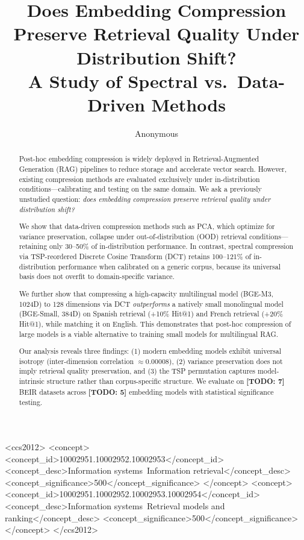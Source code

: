 \documentclass[sigconf]{acmart}
\begin{document}
\title{Does Embedding Compression Preserve Retrieval Quality Under Distribution Shift?\\ A Study of Spectral vs.\ Data-Driven Methods}

\author{Anonymous}

\begin{abstract}
Post-hoc embedding compression is widely deployed in Retrieval-Augmented Generation (RAG) pipelines to reduce storage and accelerate vector search. However, existing compression methods are evaluated exclusively under in-distribution conditions---calibrating and testing on the same domain. We ask a previously unstudied question: \emph{does embedding compression preserve retrieval quality under distribution shift?}

We show that data-driven compression methods such as PCA, which optimize for variance preservation, collapse under out-of-distribution (OOD) retrieval conditions---retaining only 30--50\% of in-distribution performance. In contrast, spectral compression via TSP-reordered Discrete Cosine Transform (DCT) retains 100--121\% of in-distribution performance when calibrated on a generic corpus, because its universal basis does not overfit to domain-specific variance.

We further show that compressing a high-capacity multilingual model (BGE-M3, 1024D) to 128 dimensions via DCT \emph{outperforms} a natively small monolingual model (BGE-Small, 384D) on Spanish retrieval (+10\% Hit@1) and French retrieval (+20\% Hit@1), while matching it on English. This demonstrates that post-hoc compression of large models is a viable alternative to training small models for multilingual RAG.

Our analysis reveals three findings: (1) modern embedding models exhibit universal isotropy (inter-dimension correlation $\approx 0.00008$), (2) variance preservation does not imply retrieval quality preservation, and (3) the TSP permutation captures model-intrinsic structure rather than corpus-specific structure. We evaluate on \textbf{[TODO: 7]} BEIR datasets across \textbf{[TODO: 5]} embedding models with statistical significance testing.
\end{abstract}

\begin{CCSXML}
<ccs2012>
<concept>
<concept_id>10002951.10002952.10002953</concept_id>
<concept_desc>Information systems~Information retrieval</concept_desc>
<concept_significance>500</concept_significance>
</concept>
<concept>
<concept_id>10002951.10002952.10002953.10002954</concept_id>
<concept_desc>Information systems~Retrieval models and ranking</concept_desc>
<concept_significance>500</concept_significance>
</concept>
</ccs2012>
\end{CCSXML}
\end{document}
